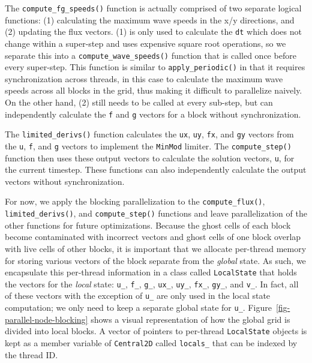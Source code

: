 The \texttt{compute\_fg\_speeds()} function is actually comprised of two
separate logical functions: (1) calculating the maximum wave speeds in
the x/y directions, and (2) updating the flux vectors. (1) is only used
to calculate the \texttt{dt} which does not change within a super-step
and uses expensive square root operations, so we separate this into a
\texttt{compute\_wave\_speeds()} function that is called once before
every super-step. This function is similar to \texttt{apply\_periodic()}
in that it requires synchronization across threads, in this case to
calculate the maximum wave speeds across all blocks in the grid, thus
making it difficult to parallelize naively. On the other hand, (2) still
needs to be called at every sub-step, but can independently calculate the
\texttt{f} and \texttt{g} vectors for a block without synchronization.

The \texttt{limited\_derivs()} function calculates the \texttt{ux},
\texttt{uy}, \texttt{fx}, and \texttt{gy} vectors from the \texttt{u},
\texttt{f}, and \texttt{g} vectors to implement the \texttt{MinMod}
limiter. The \texttt{compute\_step()} function then uses these output
vectors to calculate the solution vectors, \texttt{u}, for the current
timestep. These functions can also independently calculate the output
vectors without synchronization.



For now, we apply the blocking parallelization to the
\texttt{compute\_flux()}, \texttt{limited\_derivs()}, and
\texttt{compute\_step()} functions and leave parallelization of the other
functions for future optimizations. Because the ghost cells of each block
become contaminated with incorrect vectors and ghost cells of one block
overlap with live cells of other blocks, it is important that we
allocate per-thread memory for storing various vectors of the block
separate from the \emph{global} state. As such, we encapsulate this
per-thread information in a class called \texttt{LocalState} that holds
the vectors for the \emph{local} state: \texttt{u\_}, \texttt{f\_},
\texttt{g\_}, \texttt{ux\_}, \texttt{uy\_}, \texttt{fx\_}, \texttt{gy\_},
and \texttt{v\_}. In fact, all of these vectors with the exception of
\texttt{u\_} are only used in the local state computation; we only need
to keep a separate global state for
\texttt{u\_}. Figure~\ref{fig-parallel-node-blocking} shows a visual
representation of how the global grid is divided into local blocks. A
vector of pointers to per-thread \texttt{LocalState} objects is kept as a
member variable of \texttt{Central2D} called \texttt{locals\_} that can
be indexed by the thread ID.

